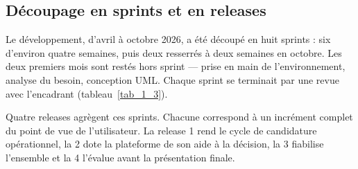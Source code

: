 \documentclass[]{./tpl/isipfe}
\begin{document}
\subsection{Découpage en sprints et en releases}
\label{sec_1_8_2}
Le développement, d’avril à octobre 2026, a été découpé en huit sprints : six d’environ quatre semaines, puis deux resserrés à deux semaines en octobre. Les deux premiers mois sont restés hors sprint — prise en main de l’environnement, analyse du besoin, conception UML. Chaque sprint se terminait par une revue avec l’encadrant (tableau~\ref{tab_1_3}).

Quatre releases agrègent ces sprints. Chacune correspond à un incrément complet du point de vue de l’utilisateur. La release 1 rend le cycle de candidature opérationnel, la 2 dote la plateforme de son aide à la décision, la 3 fiabilise l’ensemble et la 4 l’évalue avant la présentation finale.
\end{document}
